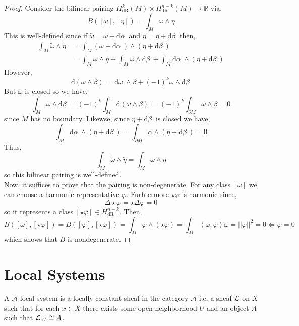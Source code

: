 \documentclass[12pt]{extarticle}
\newcommand{\R}{\mathbb{R}}
\renewcommand{\d}[1]{ \mathrm{d}#1 \:}
\theoremstyle{definition}
\newenvironment{definition}[1][Definition:]{\begin{trivlist}
\item[\hskip \labelsep {\bfseries #1}]}{\end{trivlist}}
\newcommand{\inner}[2]{\left< #1, #2 \right>}
\begin{document}
\begin{proof}
Consider the bilinear pairing $H^k_{\mathrm{dR}}(M) \times H^{n-k}_{\mathrm{dR}}(M) \to \R$ via,
\[ B([\omega], [\eta]) = \int_M \omega \wedge \eta \]
This is well-defined since if $\tilde{\omega} = \omega + \d{\alpha}$ and $\tilde{\eta} = \eta + \d{\beta}$ then,
\begin{align*}
\int_M \tilde{\omega} \wedge \tilde{\eta} & = \int_M (\omega + \d{\alpha}) \wedge (\eta  + \d{\beta}) 
\\
& = \int_M \omega \wedge \eta + \int_M \omega \wedge \d{\beta} + \int_M \d{\alpha} \wedge (\eta + \d{\beta}) 
\end{align*}
However,
\[ \d{(\omega \wedge \beta)} = \d{\omega} \wedge \beta + (-1)^k \omega \wedge
 \d{\beta} \]
But $\omega$ is closed so we have,
\[ \int_M \omega \wedge
 \d{\beta} = (-1)^k \int_M \d{(\omega \wedge \beta)} = (-1)^k \int_{\partial M} \omega \wedge \beta = 0 \]
since $M$ has no boundary. Likewse, since $\eta + \d{\beta}$ is closed we have,
\[ \int_M \d{\alpha} \wedge (\eta + \d{\beta}) = \int_{\partial M} \alpha \wedge (\eta + \d{\beta}) = 0 \]
Thus,
\[ \int_M \tilde{\omega} \wedge \tilde{\eta} = \int_M \omega \wedge \eta \]
so this bilinear pairing is well-defined. 
\bigskip\\
Now, it suffices to prove that the pairing is non-degenerate. For any class $[\omega]$ we can choose a harmonic representative $\varphi$. Furhtermore $\star \varphi$ is harmonic since,
\[ \Delta \star \varphi = \star \Delta \varphi = 0 \]
so it represents a class $[\star \varphi] \in H^{n-k}_{\text{dR}}$. Then,
\[ B([\omega], [\star \varphi]) = B([\varphi], [\star \varphi]) = \int_M \varphi \wedge (\star \varphi) = \int_M \inner{\varphi}{\varphi} \omega = || \varphi ||^2 = 0 \iff \varphi = 0 \]
which shows that $B$ is nondegenerate.
\end{proof}


\section{Local Systems}

\newcommand{\A}{\mathcal{A}}
\newcommand{\E}{\mathcal{E}}

\begin{definition}
A $\A$-local system is a locally constant sheaf in the category $\A$ i.e. a sheaf $\mathcal{L}$ on $X$ such that for each $x \in X$ there exists some open neighborhood $U$ and an object $A$ such that $\mathcal{L} |_U \cong \underline{A}$.
\end{definition}
\end{document}
